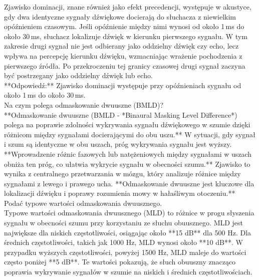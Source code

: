 \documentclass{article}
\begin{document}
Zjawisko dominacji, znane również jako efekt precedencji, występuje w akustyce, gdy dwa identyczne sygnały dźwiękowe docierają do słuchacza z niewielkim opóźnieniem czasowym. Jeśli opóźnienie między nimi wynosi od około 1 ms do około 30 ms, słuchacz lokalizuje dźwięk w kierunku pierwszego sygnału. W tym zakresie drugi sygnał nie jest odbierany jako oddzielny dźwięk czy echo, lecz wpływa na percepcję kierunku dźwięku, wzmacniając wrażenie pochodzenia z pierwszego źródła. Po przekroczeniu tej granicy czasowej drugi sygnał zaczyna być postrzegany jako oddzielny dźwięk lub echo. \\
**Odpowiedź:** Zjawisko dominacji występuje przy opóźnieniach sygnału od około 1 ms do około 30 ms. \\
Na czym polega odmaskowanie dwuuszne (BMLD)? \\
**Odmaskowanie dwuuszne (BMLD - *Binaural Masking Level Difference*) polega na poprawie zdolności wykrywania sygnału dźwiękowego w szumie dzięki różnicom między sygnałami docierającymi do obu uszu.** W sytuacji, gdy sygnał i szum są identyczne w obu uszach, próg wykrywania sygnału jest wyższy. **Wprowadzenie różnic fazowych lub natężeniowych między sygnałami w uszach obniża ten próg, co ułatwia wykrycie sygnału w obecności szumu.** Zjawisko to wynika z centralnego przetwarzania w mózgu, który analizuje różnice między sygnałami z lewego i prawego ucha. **Odmaskowanie dwuuszne jest kluczowe dla lokalizacji dźwięku i poprawy rozumienia mowy w hałaśliwym otoczeniu.** \\
Podać typowe wartości odmaskowania dwuusznego. \\
Typowe wartości odmaskowania dwuusznego (MLD) to różnice w progu słyszenia sygnału w obecności szumu przy korzystaniu ze słuchu obuusznego. MLD jest największe dla niskich częstotliwości, osiągając około **15 dB** dla 500 Hz. Dla średnich częstotliwości, takich jak 1000 Hz, MLD wynosi około **10 dB**. W przypadku wyższych częstotliwości, powyżej 1500 Hz, MLD maleje do wartości często poniżej **5 dB**. Te wartości pokazują, że słuch obuuszny znacząco poprawia wykrywanie sygnałów w szumie na niskich i średnich częstotliwościach.
\end{document}
